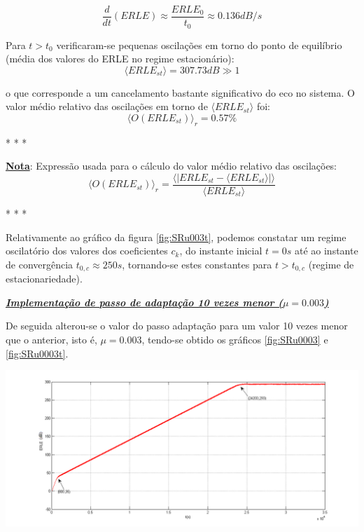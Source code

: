 \documentclass[a4paper,11pt]{report}
\begin{document}
$$\frac{d}{dt}\left(ERLE\right)\approx{\frac{ERLE_{0}}{t_{0}}}\approx0.136dB/s$$   

 Para $t>t_{0}$ verificaram-se pequenas oscilações em torno do ponto de equilíbrio (média dos valores do ERLE no regime estacionário):
 $$\langle{ERLE}_{st}\rangle=307.73dB\gg1$$
 
 o que corresponde a um cancelamento bastante significativo do eco no sistema. O valor médio relativo das oscilações em torno de $\langle{ERLE}_{st}\rangle$ foi:
 $$\langle O(ERLE_{st}) \rangle_r= 0.57 \%$$

\vspace{15pt}
 
 
\begin{center}
* * *
\end{center}

\underline{\textbf{Nota}}: Expressão usada para o cálculo do valor médio relativo das oscilações: $$\langle O(ERLE_{st}) \rangle_r=\frac{\langle |ERLE_{st}-\langle ERLE_{st} \rangle| \rangle}{\langle ERLE_{st} \rangle}$$ 

\begin{center}
* * *
\end{center}

\vspace{15pt}
 


Relativamente ao gráfico da figura \ref{fig:SRu003t}, podemos constatar um regime oscilatório dos valores dos coeficientes $c_k$, do instante inicial $t=0s$ até ao instante de convergência $t_{0,c}\approx 250s$, tornando-se estes constantes para $t>t_{0,c}$ (regime de estacionariedade).\\
\par

\large\underline{{\textit{\textbf{Implementação de passo de adaptação 10 vezes menor ($\mu=0.003$)}}}}\\
\par

De seguida alterou-se o valor do passo adaptação para um valor 10 vezes menor que o anterior, isto é, $\mu=0.003$, tendo-se obtido os gráficos \ref{fig:SRu0003} e \ref{fig:SRu0003t}.


\begin{center}
     \includegraphics[angle=0,width=1\textwidth]{SRu0003.png}
     \label{fig:SRu0003}
     \end{center}
\end{document}

